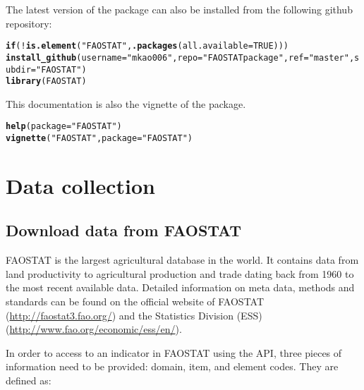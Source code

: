 \documentclass[nojss]{jss}\usepackage[]{graphicx}\usepackage[]{color}
\makeatletter
\newcommand{\hlnum}[1]{\textcolor[rgb]{0.686,0.059,0.569}{#1}}%
\newcommand{\hlstr}[1]{\textcolor[rgb]{0.192,0.494,0.8}{#1}}%
\newcommand{\hlopt}[1]{\textcolor[rgb]{0,0,0}{#1}}%
\newcommand{\hlstd}[1]{\textcolor[rgb]{0.345,0.345,0.345}{#1}}%
\newcommand{\hlkwa}[1]{\textcolor[rgb]{0.161,0.373,0.58}{\textbf{#1}}}%
\newcommand{\hlkwc}[1]{\textcolor[rgb]{0.333,0.667,0.333}{#1}}%
\newcommand{\hlkwd}[1]{\textcolor[rgb]{0.737,0.353,0.396}{\textbf{#1}}}%
\newenvironment{kframe}{%
 \def\at@end@of@kframe{}%
 \ifinner\ifhmode%
  \def\at@end@of@kframe{\end{minipage}}%
  \begin{minipage}{\columnwidth}%
 \fi\fi%
 \def\FrameCommand##1{\hskip\@totalleftmargin \hskip-\fboxsep
 \colorbox{shadecolor}{##1}\hskip-\fboxsep
     \hskip-\linewidth \hskip-\@totalleftmargin \hskip\columnwidth}%
 \MakeFramed {\advance\hsize-\width
   \@totalleftmargin\z@ \linewidth\hsize
   \@setminipage}}%
 {\par\unskip\endMakeFramed%
 \at@end@of@kframe}
\newenvironment{knitrout}{}{} %
\makeatother
\begin{document}
The latest version of the package can also be installed from the following github repository:

\begin{knitrout}
\color{fgcolor}\begin{kframe}
\begin{alltt}
\hlkwa{if}\hlstd{(}\hlopt{!}\hlkwd{is.element}\hlstd{(}\hlstr{"FAOSTAT"}\hlstd{,} \hlkwd{.packages}\hlstd{(}\hlkwc{all.available} \hlstd{=} \hlnum{TRUE}\hlstd{)))}
   \hlkwd{install_github}\hlstd{(}\hlkwc{username} \hlstd{=} \hlstr{"mkao006"}\hlstd{,} \hlkwc{repo} \hlstd{=} \hlstr{"FAOSTATpackage"}\hlstd{,} \hlkwc{ref} \hlstd{=} \hlstr{"master"}\hlstd{,} \hlkwc{subdir} \hlstd{=} \hlstr{"FAOSTAT"}\hlstd{)}
\hlkwd{library}\hlstd{(FAOSTAT)}
\end{alltt}
\end{kframe}
\end{knitrout}

This documentation is also the vignette of the package.

\begin{knitrout}
\color{fgcolor}\begin{kframe}
\begin{alltt}
\hlkwd{help}\hlstd{(}\hlkwc{package} \hlstd{=} \hlstr{"FAOSTAT"}\hlstd{)}
\hlkwd{vignette}\hlstd{(}\hlstr{"FAOSTAT"}\hlstd{,} \hlkwc{package} \hlstd{=} \hlstr{"FAOSTAT"}\hlstd{)}
\end{alltt}
\end{kframe}
\end{knitrout}

\section{Data collection}
\subsection{Download data from FAOSTAT}

FAOSTAT is the largest agricultural database in the world. It contains data from land productivity to agricultural production and trade dating back from 1960 to the most recent available data. Detailed information on meta data, methods and standards can be found on the official website of FAOSTAT (\url{http://faostat3.fao.org/}) and the Statistics Division (ESS) (\url{http://www.fao.org/economic/ess/en/}).

In order to access to an indicator in FAOSTAT using the API, three pieces of information need to be provided: domain, item, and element codes. They are defined as:
\end{document}
